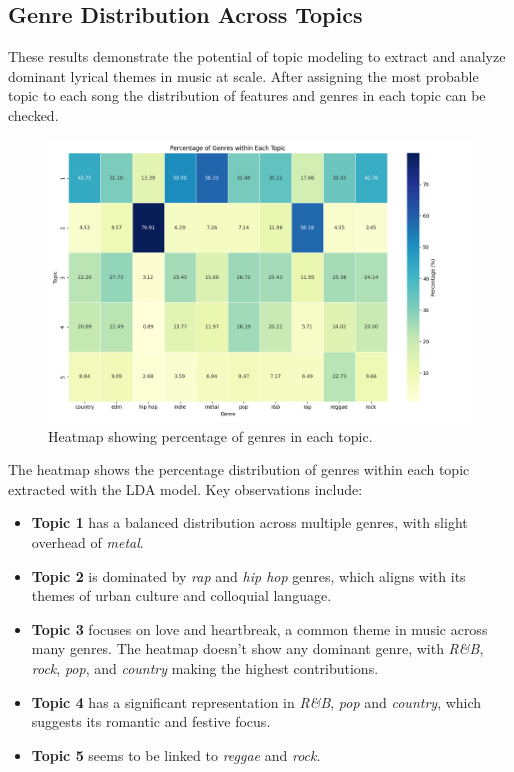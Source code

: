 \subsection{Genre Distribution Across Topics}
These results demonstrate the potential of topic modeling to extract and
analyze dominant lyrical themes in music at scale. After assigning the most
probable topic to each song the distribution of features and genres in each
topic can be checked.


\begin{center}
\begin{figure}[H]
  \centering
  \includegraphics[width=5in]{img/lda_genres_distribution.png}
  \caption{Heatmap showing percentage of genres in each topic.}
  \label{Figure:fig_eh}
\end{figure}
\end{center}

The heatmap shows the percentage distribution of genres within each topic
extracted with the LDA model. Key observations include:

\begin{itemize}
  \item \textbf{Topic 1} has a balanced distribution across multiple genres,
    with slight overhead of \textit{metal}. 
  \item \textbf{Topic 2} is dominated by \textit{rap} and \textit{hip hop}
    genres, which aligns with its themes of urban culture and colloquial
    language.
  \item \textbf{Topic 3} focuses on love and heartbreak, a common theme in
    music across many genres. The heatmap doesn't show any dominant genre, with
    \textit{R\&B}, \textit{rock}, \textit{pop}, and \textit{country} making the
    highest contributions.
  \item \textbf{Topic 4} has a significant representation in \textit{R\&B},
    \textit{pop} and \textit{country}, which suggests its romantic and festive
    focus.
  \item \textbf{Topic 5} seems to be linked to \textit{reggae} and
    \textit{rock}.
\end{itemize}

